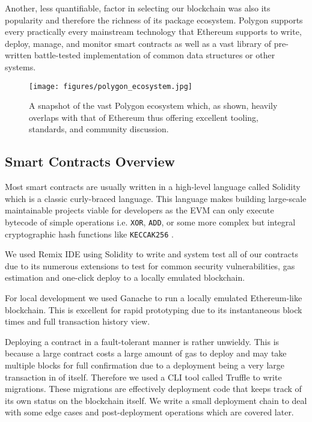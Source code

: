 \documentclass[10pt,journal,compsoc]{IEEEtran}
\begin{document}
Another, less quantifiable, factor in selecting our blockchain was also its popularity and therefore the richness of its package ecosystem. Polygon supports every practically every mainstream technology that Ethereum supports to write, deploy, manage, and monitor smart contracts as well as a vast library of pre-written battle-tested implementation of common data structures or other systems.

\begin{figure}[!h]
    \centering
    \texttt{[image: figures/polygon\_ecosystem.jpg]}
    \caption{A snapshot of the vast Polygon ecosystem \cite{polygon_matic_(@0xpolygon)_twitter} which, as shown, heavily overlaps with that of Ethereum thus offering excellent tooling, standards, and community discussion.}
    \label{fig:polygoneco}
\end{figure}

\subsection{Smart Contracts Overview}
Most smart contracts are usually written in a high-level language called Solidity \cite{solidity_programming_language} which is a classic curly-braced language. This language makes building large-scale maintainable projects viable for developers as the EVM can only execute bytecode of simple operations i.e. \texttt{XOR}, \texttt{ADD}, or some more complex but integral cryptographic hash functions like \texttt{KECCAK256} \cite{10.1007/978-3-642-38348-9_19}.

We used Remix \cite{verma2021study} IDE using Solidity to write and system test all of our contracts due to its numerous extensions to test for common security vulnerabilities, gas estimation and one-click deploy to a locally emulated blockchain.

For local development we used Ganache \cite{truffle_suite_ganache} to run a locally emulated Ethereum-like blockchain. This is excellent for rapid prototyping due to its instantaneous block times and full transaction history view.

Deploying a contract in a fault-tolerant manner is rather unwieldy. This is because a large contract costs a large amount of gas to deploy and may take multiple blocks for full confirmation due to a deployment being a very large transaction in of itself. Therefore we used a CLI tool called Truffle \cite{truffle_suite_truffle} to write migrations. These migrations are effectively deployment code that keeps track of its own status on the blockchain itself. We write a small deployment chain to deal with some edge cases and post-deployment operations which are covered later.
\end{document}
